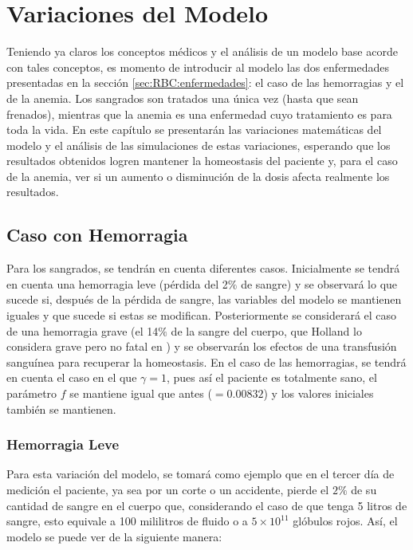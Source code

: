 \chapter{Variaciones del Modelo}\label{chap:variaciones}

Teniendo ya claros los conceptos médicos y el análisis de un modelo base acorde con tales conceptos, es momento de introducir al modelo las dos enfermedades presentadas en la sección \ref{sec:RBC:enfermedades}: el caso de las hemorragias y el de la anemia. Los sangrados son tratados una única vez (hasta que sean frenados), mientras que la anemia es una enfermedad cuyo tratamiento es para toda la vida. En este capítulo se presentarán las variaciones matemáticas del modelo y el análisis de las simulaciones de estas variaciones, esperando que los resultados obtenidos logren mantener la homeostasis del paciente y, para el caso de la anemia, ver si un aumento o disminución de la dosis afecta realmente los resultados.

\section{Caso con Hemorragia}\label{Sec:variaciones:hemorragia}

Para los sangrados, se tendrán en cuenta diferentes casos. Inicialmente se tendrá en cuenta una hemorragia leve (pérdida del 2$\%$ de sangre) y se observará lo que sucede si, después de la pérdida de sangre, las variables del modelo se mantienen iguales y que sucede si estas se modifican. Posteriormente se considerará el caso de una hemorragia grave (el 14$\%$ de la sangre del cuerpo, que Holland lo considera grave pero no fatal en \cite{PerdidaSangre}) y se observarán los efectos de una transfusión sanguínea para recuperar la homeostasis. En el caso de las hemorragias, se tendrá en cuenta el caso en el que $\gamma =1$, pues así el paciente es totalmente sano, el parámetro $f$ se mantiene igual que antes ($=0.00832$) y los valores iniciales también se mantienen.

\subsection{Hemorragia Leve}\label{subsec:variaciones:hemorragia:leve}

Para esta variación del modelo, se tomará como ejemplo que en el tercer día de medición el paciente, ya sea por un corte o un accidente, pierde el $2\%$ de su cantidad de sangre en el cuerpo que, considerando el caso de que tenga 5 litros de sangre, esto equivale a 100 mililitros de fluido o a $5\times 10^{11}$ glóbulos rojos. Así, el modelo se puede ver de la siguiente manera:

